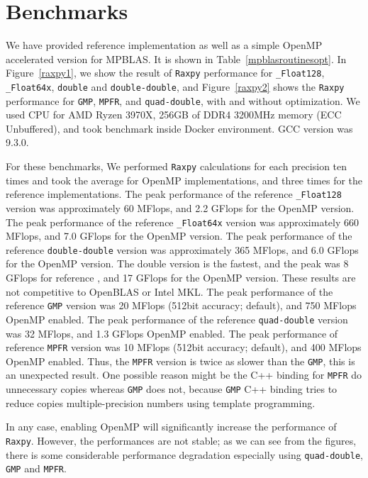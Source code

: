\documentclass[12pt]{article}
\begin{document}
\section{Benchmarks}
\label{sec:benchmarks}
We have provided reference implementation as well as a simple OpenMP accelerated version for MPBLAS. It is shown in Table~\ref{mpblasroutinesopt}.
In Figure~\ref{raxpy1}, we show the result of {\tt Raxpy} performance for {\tt \_Float128}, {\tt \_Float64x}, {\tt double} and  {\tt double-double},
 and Figure~\ref{raxpy2} shows the {\tt Raxpy} performance for {\tt GMP}, {\tt MPFR}, and {\tt quad-double}, with and without optimization. We used CPU for AMD Ryzen 3970X, 256GB of DDR4 3200MHz memory (ECC Unbuffered), and took benchmark inside Docker environment. GCC version was 9.3.0.
 
For these benchmarks, We performed {\tt Raxpy} calculations for each precision ten times and took the average for OpenMP implementations, and three times for the reference implementations. The peak performance of the reference {\tt \_Float128} version was approximately 60 MFlops, and 2.2 GFlops for the OpenMP version. The peak performance of the reference {\tt \_Float64x} version was approximately 660 MFlops, and 7.0 GFlops for the OpenMP version. The peak performance of the reference {\tt double-double} version was approximately 365 MFlops, and 6.0 GFlops for the OpenMP version. The double version is the fastest, and the peak was 8 GFlops for reference , and 17 GFlops for the OpenMP version. These results are not competitive to OpenBLAS or Intel MKL. 
The peak performance of the reference {\tt GMP} version was 20 MFlops (512bit accuracy; default), and 750 MFlops OpenMP enabled.
The peak performance of the reference {\tt quad-double} version was 32 MFlops, and 1.3 GFlops OpenMP enabled.
The peak performance of reference {\tt MPFR} version was 10 MFlops (512bit accuracy; default), and 400 MFlops OpenMP enabled.
Thus, the {\tt MPFR} version is twice as slower than the {\tt GMP}, this is an unexpected result. One possible reason might be the C++ binding
for {\tt MPFR} do unnecessary copies whereas {\tt GMP} does not, because {\tt GMP} C++ binding tries to reduce copies multiple-precision numbers using template programming.

In any case, enabling OpenMP will significantly increase the performance of {\tt Raxpy}. However, the performances are not stable; as we can see from the figures, there is some considerable performance degradation especially using {\tt quad-double}, {\tt GMP} and {\tt MPFR}.
\end{document}

